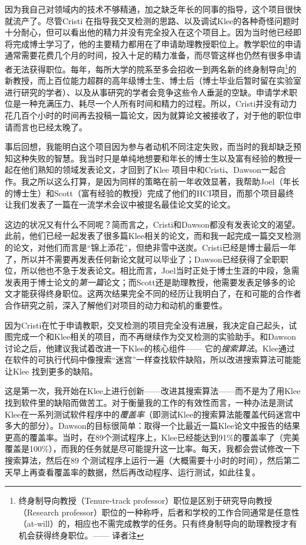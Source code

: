 \documentclass[letter,12pt]{book}
\begin{document}
\begin{CJK}{UTF8}{gbsn}
因为我自己对领域内的技术不够精通，加之缺乏年长的同事的指导，这个项目很快就流产了。尽管Cristi 在指导我交叉检测的思路、以及调试Klee的各种奇怪问题时十分耐心，但可以看出他的精力并没有完全投入在这个项目上。因为当时他已经即将完成博士学习了，他的主要精力都用在了申请助理教授职位上。教学职位的申请通常需要花费几个月的时间，投入十足的精力准备，而尽管这样也仍然有很多申请者无法获得职位。每年，每所大学的院系至多会招收一到两名新的终身制导向\footnote{终身制导向教授（Tenure-track professor）职位是区别于研究导向教授（Research professor）职位的一种称呼，后者和学校的工作合同通常是任意性（at-will）的，相应也不需完成教学的任务。只有终身制导向的助理教授才有机会获得终身职位。—— 译者注}的新教授，而上百位能力超群的高年级博士生、博士后（博士毕业后暂时留在实验室进行研究的学者）、以及从事研究的学者会竞争这些令人垂涎的空缺。申请学术职位是一种充满压力、耗尽一个人所有时间和精力的过程。所以，Cristi并没有动力花几百个小时的时间再去投稿一篇论文，因为就算论文被接收了，对于他的职位申请而言也已经太晚了。

事后回想，我能明白这个项目因为参与者动机不同注定失败，而当时的我却缺乏预知这种失败的智慧。我当时只是单纯地想要和年长的博士生以及富有经验的教授一起在他们熟知的领域发表论文，才回到了Klee 项目中和Cristi、Dawson一起合作。我之所以这么打算，是因为同样的策略在前一年收效显著，我帮助Joel（年长的博士生）和Scott（富有经验的教授）完成了他们的HCI项目，而那个项目最终让我们发表了一篇在一流学术会议中被提名最佳论文奖的论文。

这边的状况又有什么不同呢？简而言之，Cristi和Dawson都没有发表论文的渴望。此前，他们已经一起发表了很多篇Klee相关的论文，而和我一起完成一篇交叉检测的论文，对他们而言是“锦上添花”，但绝非雪中送炭。Cristi已经是博士最后一年了，所以并不需要再发表任何新论文就可以毕业了；Dawson已经获得了全职职位，所以他也不急于发表论文。相比而言，Joel当时正处于博士生涯的中段，急需发表用于博士论文的\emph{第一篇}论文；而Scott还是助理教授，他需要发表足够多的论文才能获得终身职位。这两次结果完全不同的经历让我明白了，在和可能的合作者合作研究之前，深入了解他们对项目的动力和动机的重要性。

\breakline

因为Cristi在忙于申请教职，交叉检测的项目完全没有进展，我决定自己起头，试图完成一个和Klee相关的项目，而不再继续作为交叉检测的实验助手。和Dawson讨论之后，他建议我试着改进一下Klee的核心组件—— 它的\emph{搜索算法}。Klee通过在软件的可执行代码中像搜索“迷宫”一样查找软件缺陷，所以改进搜索算法可能能让Klee 找到更多的缺陷。

这是第一次，我开始在Klee上进行创新——改进其搜索算法——而不是为了用Klee找到软件里的缺陷而做苦工。对于衡量我的工作的有效性而言，一种办法是测试Klee在一系列测试软件程序中的\emph{覆盖率}（即测试Klee的搜索算法能覆盖代码迷宫中多大的部分）。Dawson的目标很简单：取得一个比最近一篇Klee论文中报告的结果更高的覆盖率。当时，在89个测试程序上，Klee已经能达到91\%的覆盖率了（完美覆盖是100\%），而我的任务就是尽可能提升这一比率。每天，我都会尝试修改一下搜索算法，然后在89 个测试程序上运行一遍（大概需要十小时的时间），然后第二天早上再查看覆盖率的数据，然后再改动程序、运行测试，如此往复。


\end{CJK}
\end{document}
